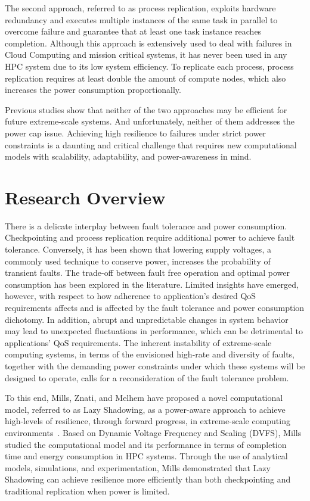 The second approach, referred to as process replication, exploits hardware redundancy and executes multiple instances of the same task 
in parallel to overcome failure and guarantee that at least one task instance reaches completion. Although this approach is extensively used 
to deal with failures in 
Cloud Computing and mission critical systems, it has 
never been used in any HPC system due to its low system efficiency. To replicate each process, process replication requires 
at least double the amount of compute nodes, which also increases the power consumption proportionally. 

Previous studies show that neither of the two approaches may be efficient for future extreme-scale systems. And unfortunately, neither 
of them addresses the power cap issue. 
Achieving high resilience to failures under strict power constraints is a daunting and critical challenge that requires new 
computational models with scalability, adaptability, and power-awareness in mind. 
 
\section{Research Overview}

There is a delicate interplay between fault tolerance and power consumption. Checkpointing and process replication require 
additional power to achieve fault tolerance. Conversely, it has been shown that lowering supply voltages, a commonly used 
technique to conserve power, increases the probability of transient faults. The trade-off between fault free operation and 
optimal power consumption has been explored in the literature. Limited insights have emerged, however, with respect to how 
adherence to application's desired QoS requirements affects and is affected by the fault tolerance and power consumption 
dichotomy. In addition, abrupt and unpredictable changes in system behavior may lead to unexpected fluctuations in performance, 
which can be detrimental to applications’ QoS requirements. The inherent instability of extreme-scale computing systems, 
in terms of the envisioned high-rate and diversity of faults, together with the demanding power constraints under which 
these systems will be designed to operate, calls for a 
reconsideration of the fault tolerance problem.

To this end, Mills, Znati, and Melhem have proposed a novel computational model, referred to as Lazy Shadowing, as a  
power-aware approach to achieve high-levels of resilience, through forward progress, in extreme-scale computing environments~\cite{mills_2014_icnc,mills_2014_pdp,mills2014power}. Based on Dynamic Voltage Frequency and Scaling (DVFS), Mills studied the computational model and its performance in terms of completion time and energy consumption in HPC systems. Through the use of analytical models, simulations, and experimentation, Mills demonstrated that Lazy Shadowing can achieve resilience more efficiently than both checkpointing and traditional replication when power is limited.


